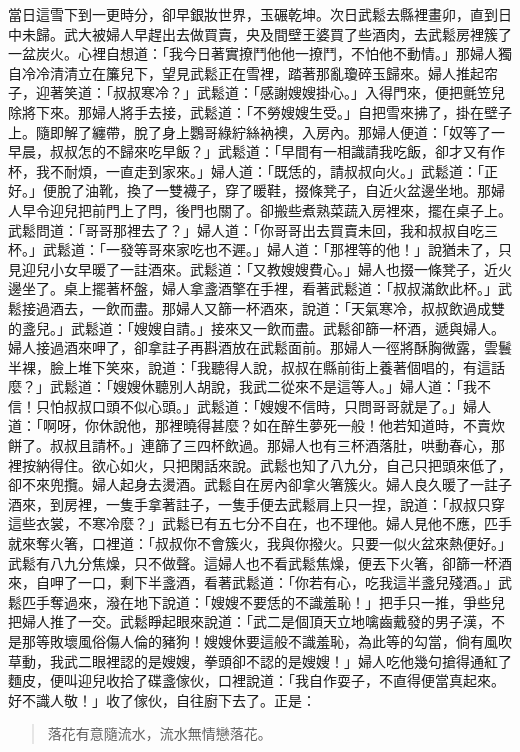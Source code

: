 當日這雪下到一更時分，卻早銀妝世界，玉碾乾坤。次日武鬆去縣裡畫卯，直到日中未歸。武大被婦人早趕出去做買賣，央及間壁王婆買了些酒肉，去武鬆房裡簇了一盆炭火。心裡自想道：「我今日著實撩鬥他他一撩鬥，不怕他不動情。」那婦人獨自冷冷清清立在簾兒下，望見武鬆正在雪裡，踏著那亂瓊碎玉歸來。婦人推起帘子，迎著笑道：「叔叔寒冷？」武鬆道：「感謝嫂嫂掛心。」入得門來，便把氈笠兒除將下來。那婦人將手去接，武鬆道：「不勞嫂嫂生受。」自把雪來拂了，掛在壁子上。隨即解了纏帶，脫了身上鸚哥綠紵絲衲襖，入房內。那婦人便道：「奴等了一早晨，叔叔怎的不歸來吃早飯？」武鬆道：「早間有一相識請我吃飯，卻才又有作杯，我不耐煩，一直走到家來。」婦人道：「既恁的，請叔叔向火。」武鬆道：「正好。」便脫了油靴，換了一雙襪子，穿了暖鞋，掇條凳子，自近火盆邊坐地。那婦人早令迎兒把前門上了閂，後門也關了。卻搬些煮熟菜蔬入房裡來，擺在桌子上。武鬆問道：「哥哥那裡去了？」婦人道：「你哥哥出去買賣未回，我和叔叔自吃三杯。」武鬆道：「一發等哥來家吃也不遲。」婦人道：「那裡等的他！」說猶未了，只見迎兒小女早暖了一註酒來。武鬆道：「又教嫂嫂費心。」婦人也掇一條凳子，近火邊坐了。桌上擺著杯盤，婦人拿盞酒擎在手裡，看著武鬆道：「叔叔滿飲此杯。」武鬆接過酒去，一飲而盡。那婦人又篩一杯酒來，說道：「天氣寒冷，叔叔飲過成雙的盞兒。」武鬆道：「嫂嫂自請。」接來又一飲而盡。武鬆卻篩一杯酒，遞與婦人。婦人接過酒來呷了，卻拿註子再斟酒放在武鬆面前。那婦人一徑將酥胸微露，雲鬟半裸，臉上堆下笑來，說道：「我聽得人說，叔叔在縣前街上養著個唱的，有這話麼？」武鬆道：「嫂嫂休聽別人胡說，我武二從來不是這等人。」婦人道：「我不信！只怕叔叔口頭不似心頭。」武鬆道：「嫂嫂不信時，只問哥哥就是了。」婦人道：「啊呀，你休說他，那裡曉得甚麼？如在醉生夢死一般！他若知道時，不賣炊餅了。叔叔且請杯。」連篩了三四杯飲過。那婦人也有三杯酒落肚，哄動春心，那裡按納得住。欲心如火，只把閑話來說。武鬆也知了八九分，自己只把頭來低了，卻不來兜攬。婦人起身去燙酒。武鬆自在房內卻拿火箸簇火。婦人良久暖了一註子酒來，到房裡，一隻手拿著註子，一隻手便去武鬆肩上只一捏，說道：「叔叔只穿這些衣裳，不寒冷麼？」武鬆已有五七分不自在，也不理他。婦人見他不應，匹手就來奪火箸，口裡道：「叔叔你不會簇火，我與你撥火。只要一似火盆來熱便好。」武鬆有八九分焦燥，只不做聲。這婦人也不看武鬆焦燥，便丟下火箸，卻篩一杯酒來，自呷了一口，剩下半盞酒，看著武鬆道：「你若有心，吃我這半盞兒殘酒。」武鬆匹手奪過來，潑在地下說道：「嫂嫂不要恁的不識羞恥！」把手只一推，爭些兒把婦人推了一交。武鬆睜起眼來說道：「武二是個頂天立地噙齒戴發的男子漢，不是那等敗壞風俗傷人倫的豬狗！嫂嫂休要這般不識羞恥，為此等的勾當，倘有風吹草動，我武二眼裡認的是嫂嫂，拳頭卻不認的是嫂嫂！」婦人吃他幾句搶得通紅了麵皮，便叫迎兒收拾了碟盞傢伙，口裡說道：「我自作耍子，不直得便當真起來。好不識人敬！」收了傢伙，自往廚下去了。正是：
\begin{quote}
落花有意隨流水，流水無情戀落花。
\end{quote}

